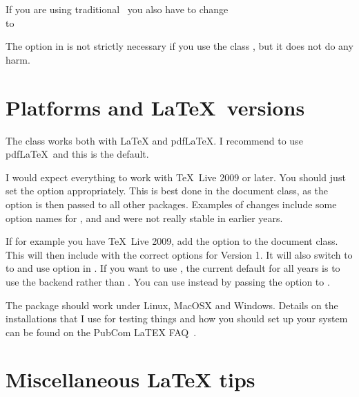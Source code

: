 If you are using traditional \BibTeX\ you also have to change\\
\verb|| to\\
\verb||

The  option in  is not strictly necessary if you use the class ,
but it does not do any harm.


\section{Platforms and \LaTeX\ versions}
\label{sec:version}

The  class works both with \LaTeX{} and pdf\LaTeX{}.
I recommend to use pdf\LaTeX\ and this is the default.

I would expect everything to work with \TeX\ Live 2009 or later.
You should just set the option  appropriately.
This is best done in the document class, as the option is then passed to all other packages.
Examples of changes include some option names for ,
and  and  were not really stable in earlier years.

If for example you have \TeX\ Live 2009, add the option  to the document class.
This will then include  with the correct options for Version 1.
It will also switch to  to 
and use option  in .
If you want to use ,
the current default for all years is to use the  backend rather than .
You can use  instead by passing the option  to .

The  package should work under Linux, MacOSX and Windows.
Details on the installations that I use for testing things
and how you should set up your system can be found on the PubCom LaTEX FAQ~\cite{latex-faq}.


\section{Miscellaneous \LaTeX{} tips}
\label{sec:latex}

